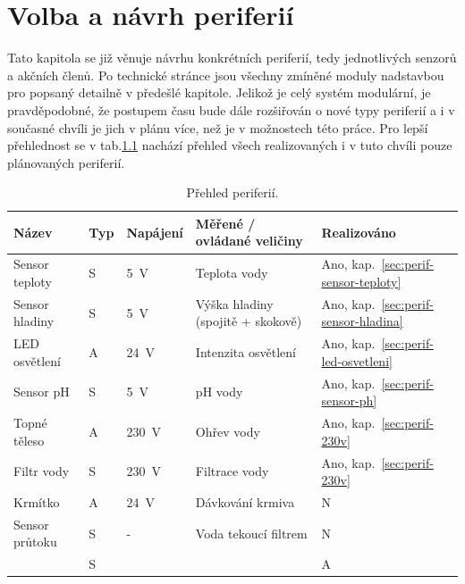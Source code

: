 \chapter{Volba a návrh periferií}
    Tato kapitola se již věnuje návrhu konkrétních periferií, tedy jednotlivých senzorů a akčních členů. Po technické stránce jsou všechny zmíněné moduly nadstavbou pro  popsaný detailně v předešlé kapitole. Jelikož je celý systém modulární, je pravděpodobné, že postupem času bude dále rozšiřován o nové typy periferií a i v současné chvíli je jich v plánu více, než je v možnostech této práce. Pro lepší přehlednost se v tab.\ref{tab:prehled-periferii} nachází přehled všech realizovaných i v tuto chvíli pouze plánovaných periferií.

    \begin{table}[h]
        \centering
        \caption{Přehled periferií.}
        \label{tab:prehled-periferii}
        \begin{tabular}{|l|l|l|l|l|}
            \hline
            Název & Typ & Napájení & Měřené / ovládané veličiny & Realizováno \\ \hline\hline
            Sensor teploty  & S & \qty{5}{V}    & Teplota vody                       & Ano, kap.~\ref{sec:perif-sensor-teploty}  \\ \hline
            Sensor hladiny  & S & \qty{5}{V}    & Výška hladiny (spojitě + skokově)  & Ano, kap.~\ref{sec:perif-sensor-hladina}  \\ \hline
            LED osvětlení   & A & \qty{24}{V}   & Intenzita osvětlení                & Ano, kap.~\ref{sec:perif-led-osvetleni}  \\ \hline
            Sensor pH       & S & \qty{5}{V}    & pH vody                            & Ano, kap.~\ref{sec:perif-sensor-ph}  \\ \hline
            Topné těleso    & A & \qty{230}{V}  & Ohřev vody                         & Ano, kap.~\ref{sec:perif-230v}  \\ \hline
            Filtr vody      & S & \qty{230}{V}  & Filtrace vody                      & Ano, kap.~\ref{sec:perif-230v}  \\ \hline
            Krmítko         & A & \qty{24}{V}   & Dávkování krmiva                   & N  \\ \hline
            Sensor průtoku  & S & -             & Voda tekoucí filtrem               & N  \\ \hline
                            & S &  &  & A  \\ \hline

\end{tabular}
\end{table}
